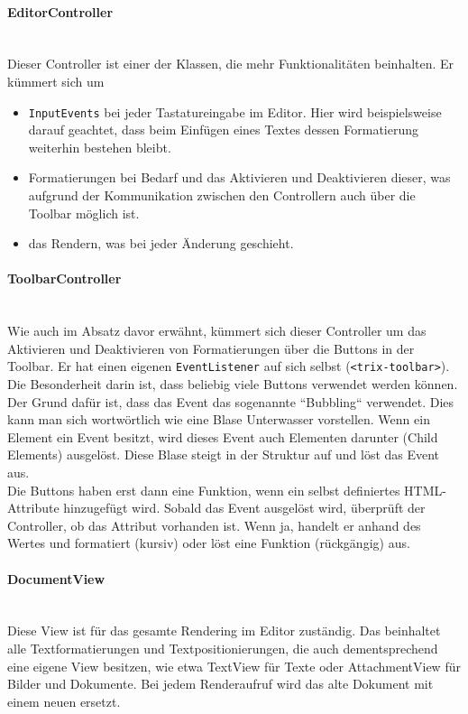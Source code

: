 \paragraph{EditorController}\mbox{}\\
Dieser Controller ist einer der Klassen, die mehr Funktionalitäten beinhalten. Er kümmert sich um 

\begin{itemize}
	\item \texttt{InputEvents} bei jeder Tastatureingabe im Editor. Hier wird beispielsweise darauf geachtet, dass beim Einfügen eines Textes dessen Formatierung weiterhin bestehen bleibt.
	\item Formatierungen bei Bedarf und das Aktivieren und Deaktivieren dieser, was aufgrund der Kommunikation zwischen den Controllern auch über die Toolbar möglich ist.
	\item das Rendern, was bei jeder Änderung geschieht.
\end{itemize}

\paragraph{ToolbarController}\mbox{}\\
Wie auch im Absatz davor erwähnt, kümmert sich dieser Controller um das Aktivieren und Deaktivieren von Formatierungen über die Buttons in der Toolbar. Er hat einen eigenen \texttt{EventListener} auf sich selbst (\texttt{<trix-toolbar>}). Die Besonderheit darin ist, dass beliebig viele Buttons verwendet werden können. Der Grund dafür ist, dass das Event das sogenannte ``Bubbling`` verwendet. Dies kann man sich wortwörtlich wie eine Blase Unterwasser vorstellen. Wenn ein Element ein Event besitzt, wird dieses Event auch Elementen darunter (Child Elements) ausgelöst. Diese Blase steigt in der Struktur auf und löst das Event aus.\\
Die Buttons haben erst dann eine Funktion, wenn ein selbst definiertes HTML-Attribute hinzugefügt wird. Sobald das Event ausgelöst wird, überprüft der Controller, ob das Attribut vorhanden ist. Wenn ja, handelt er anhand des Wertes und formatiert (kursiv) oder löst eine Funktion (rückgängig) aus.

\paragraph{DocumentView}\mbox{}\\
Diese View ist für das gesamte Rendering im Editor zuständig. Das beinhaltet alle Textformatierungen und Textpositionierungen, die auch dementsprechend eine eigene View besitzen, wie etwa TextView für Texte oder AttachmentView für Bilder und Dokumente. Bei jedem Renderaufruf wird das alte Dokument mit einem neuen ersetzt.

